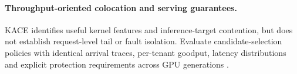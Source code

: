 \begin{longtable}{>{\raggedright\arraybackslash}p{}>{\raggedright\arraybackslash}p{}>{\raggedright\arraybackslash}p{}}
\bottomrule\end{longtable}\paragraph{Throughput-oriented colocation and serving guarantees.} KACE identifies useful kernel features and inference-target contention, but does not establish request-level tail or fault isolation. Evaluate candidate-selection policies with identical arrival traces, per-tenant goodput, latency distributions and explicit protection requirements across GPU generations \cite{s030}.
